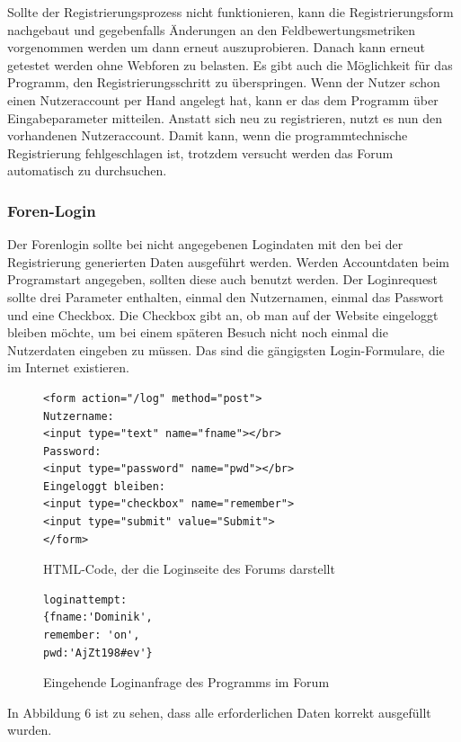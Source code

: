 Sollte der Registrierungsprozess nicht funktionieren, kann die Registrierungsform nachgebaut und gegebenfalls Änderungen an den Feldbewertungsmetriken vorgenommen werden um dann erneut auszuprobieren. Danach kann erneut getestet werden ohne Webforen zu belasten. Es gibt auch die Möglichkeit für das Programm, den Registrierungsschritt zu überspringen. Wenn der Nutzer schon einen Nutzeraccount per Hand angelegt hat, kann er das dem Programm über Eingabeparameter mitteilen. Anstatt sich neu zu registrieren, nutzt es nun den vorhandenen Nutzeraccount. Damit kann, wenn die programmtechnische Registrierung fehlgeschlagen ist, trotzdem versucht werden das Forum automatisch zu durchsuchen.

\subsubsection{Foren-Login}
Der Forenlogin sollte bei nicht angegebenen Logindaten mit den bei der Registrierung generierten Daten ausgeführt werden. Werden Accountdaten beim Programstart angegeben, sollten diese auch benutzt werden. Der Loginrequest sollte drei Parameter enthalten, einmal den Nutzernamen, einmal das Passwort und eine Checkbox. Die Checkbox gibt an, ob man auf der Website eingeloggt bleiben möchte, um bei einem späteren Besuch nicht noch einmal die Nutzerdaten eingeben zu müssen. Das sind die gängigsten Login-Formulare, die im Internet existieren.

\begin{figure}[ht]
\begin{lstlisting}[language=HTML5]
<form action="/log" method="post">
Nutzername: 
<input type="text" name="fname"></br>
Password: 
<input type="password" name="pwd"></br>
Eingeloggt bleiben: 
<input type="checkbox" name="remember">
<input type="submit" value="Submit">
</form>
\end{lstlisting}
\caption{HTML-Code, der die Loginseite des Forums darstellt}
\end{figure}


\begin{figure}[h!]
\begin{lstlisting}[language=HTML5]
loginattempt: 
{fname:'Dominik',
remember: 'on',
pwd:'AjZt198#ev'}
\end{lstlisting}
\caption{Eingehende Loginanfrage des Programms im Forum}
\end{figure}

In Abbildung 6 ist zu sehen, dass alle erforderlichen Daten korrekt ausgefüllt wurden.
\newpage

